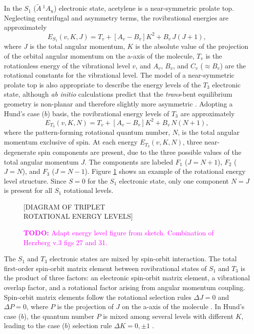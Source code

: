 \documentclass[12pt]{mitthesis}
\newcommand{\TODO} [1]{\textcolor{magenta}{\textbf{TODO:} #1}}
\newcommand{\astate}{$
  \tilde{A} \: ^1\!A_u
  $}
\begin{document}
In the $S_1$ (\astate) electronic state, acetylene is a near-symmetric
prolate top.  Neglecting centrifugal and asymmetry terms, the
rovibrational energies are approximately \cite{watson82}
\begin{equation}
  \label{eq:s1-energy-levels}
  E_{S_1}(v,K,J) = T_v + [A_v - B_v] K^2 + B_v \, J(J+1),
\end{equation}
where $J$ is the total angular momentum, $K$ is the absolute value of
the projection of the orbital angular momentum on the a-axis of the
molecule, $T_v$ is the rotationless energy of the vibrational level
$v$, and $A_v$, $B_v$, and $C_v$ ($\approx B_v$) are the rotational
constants for the vibrational level.  The model of a near-symmetric
prolate top is also appropriate to describe the energy levels of the
$T_3$ electronic state, although \emph{ab initio} calculations predict
that the \emph{trans}-bent equilibrium geometry is non-planar and
therefore slightly more asymmetric \cite{ventura03, thom07}.  Adopting
a Hund's case ($b$) basis, the rovibrational energy levels of $T_3$
are approximately
\begin{equation}
  \label{eq:t3-energy-levels}
  E_{T_3}(v,K,N) = T_v + [A_v - B_v] K^2 + B_v \, N(N+1),
\end{equation}
where the pattern-forming rotational quantum number, $N$, is the total
angular momentum exclusive of spin.  At each energy $E_{T_3}(v,K,N)$,
three near-degenerate spin components are present, due to the three
possible values of the total angular momentum $J$.  The components are
labeled $F_1$ ($J=N+1$), $F_2$ ($J=N$), and $F_3$ ($J=N-1$).  Figure
\ref{fig:triplet-rot-structure} shows an example of the rotational
energy level structure.  Since $S=0$ for the $S_1$ electronic state,
only one component $N=J$ is present for all $S_1$ rotational levels.

\begin{figure}
  \caption{\TODO{Adapt energy level figure from sketch.  Combination
      of Herzberg v.3 figs 27 and 31.}}
  \label{fig:triplet-rot-structure}
  \centering

  \vspace{4in}
  [DIAGRAM OF TRIPLET\\ 
   ROTATIONAL ENERGY LEVELS]
  \vspace{4in}
\end{figure}

The $S_1$ and $T_3$ electronic states are mixed by spin-orbit
interaction.  The total first-order spin-orbit matrix element between
rovibrational states of $S_1$ and $T_3$ is the product of three
factors: an electronic spin-orbit matrix element, a vibrational
overlap factor, and a rotational factor arising from angular momentum
coupling.  Spin-orbit matrix elements follow the rotational selection
rules $\Delta J = 0$ and $\Delta P = 0$, where $P$ is the projection
of $J$ on the a-axis of the molecule \cite{hougen64}.  In Hund's case
($b$), the quantum number $P$ is mixed among several levels with
different $K$, leading to the case ($b$) selection rule $\Delta K = 0,
\pm 1$ \cite{hougen64, stevens73}.
\end{document}
